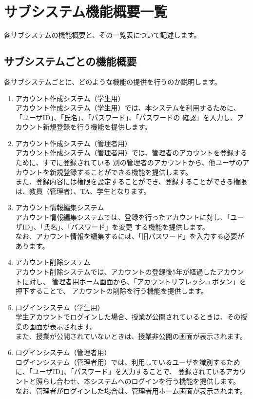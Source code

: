 \section{サブシステム機能概要一覧}
各サブシステムの機能概要と、その一覧表について記述します。
\subsection{サブシステムごとの機能概要}
各サブシステムごとに、どのような機能の提供を行うのか説明します。
\begin{enumerate}
\item アカウント作成システム（学生用）\\
アカウント作成システム（学生用）では、本システムを利用するために、「ユーザID」、「氏名」、「パスワード」、「パスワードの
確認」を入力し、アカウント新規登録を行う機能を提供します。

\item アカウント作成システム（管理者用）\\
アカウント作成システム（管理者用）では、管理者のアカウントを登録するために、すでに登録されている
別の管理者のアカウントから、他ユーザのアカウントを新規登録することができる機能を提供します。\\
また、登録内容には権限を設定することができ、登録することができる権限は、教員（管理者）、TA、学生となります。

\item アカウント情報編集システム\\
アカウント情報編集システムでは、登録を行ったアカウントに対し、「ユーザID」、「氏名」、「パスワード」を変更
する機能を提供します。\\
なお、アカウント情報を編集するには、「旧パスワード」を入力する必要があります。

\item アカウント削除システム\\
アカウント削除システムでは、アカウントの登録後5年が経過したアカウントに対し、
管理者用ホーム画面から、「アカウントリフレッシュボタン」を押下することで、
アカウントの削除を行う機能を提供します。


\item ログインシステム（学生用）\\
学生アカウントでログインした場合、授業が公開されているときは、その授業の画面が表示されます。\\
また、授業が公開されていないときは、授業非公開の画面が表示されます。

\item ログインシステム（管理者用）\\
ログインシステム（管理者用）では、利用しているユーザを識別するために、「ユーザID」、「パスワード」を入力することで、
登録されているアカウントと照らし合わせ、本システムへのログインを行う機能を提供します。\\
なお、管理者がログインした場合は、管理者用ホーム画面が表示されます。


\end{enumerate}
